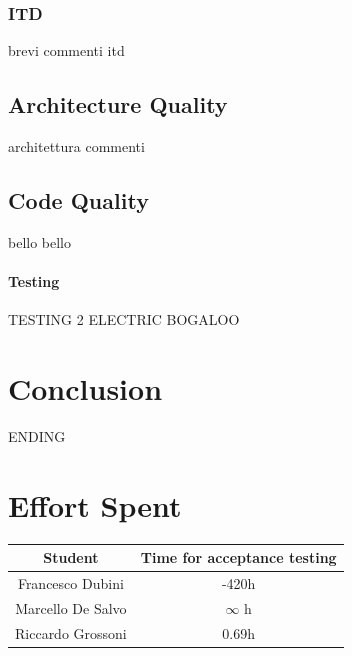 \documentclass[table, 12pt]{article}
\begin{document}
\subsubsection{ITD}
brevi commenti itd
\subsection{Architecture Quality}
architettura commenti
\subsection{Code Quality}
bello bello
\paragraph{Testing}
TESTING 2 ELECTRIC BOGALOO
\section{Conclusion}
ENDING


\section{Effort Spent}
\begin{tabular}{|c||c|}
    \hline
    Student & Time for acceptance testing\\ \hline
    Francesco Dubini & -420h \\
    Marcello De Salvo & $\infty$ h\\
    Riccardo Grossoni & 0.69h \\
    \hline
\end{tabular}
\end{document}
